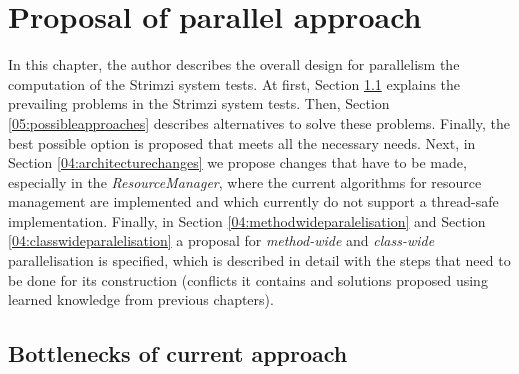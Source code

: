 \chapter{Proposal of parallel approach}
\label{04:chapter:title}

In this chapter, the author describes the overall design for parallelism the computation of the Strimzi system tests.
At first, Section \ref{05:bottlenecks} explains the prevailing problems in the Strimzi system tests.
Then, Section \ref{05:possibleapproaches} describes alternatives to solve these problems.
Finally, the best possible option is proposed that meets all the necessary needs.
Next, in Section \ref{04:architecturechanges} we propose changes that have to be made, especially in the \emph{ResourceManager}, where the current algorithms for resource management are implemented and which currently do not support a thread-safe implementation.
Finally, in Section \ref{04:methodwideparalelisation} and Section \ref{04:classwideparalelisation} a proposal for \emph{method-wide} and \emph{class-wide} parallelisation is specified, which is described in detail with the steps that need to be done for its construction (conflicts it contains and solutions proposed using learned knowledge from previous chapters).

\section{Bottlenecks of current approach}
\label{05:bottlenecks}


